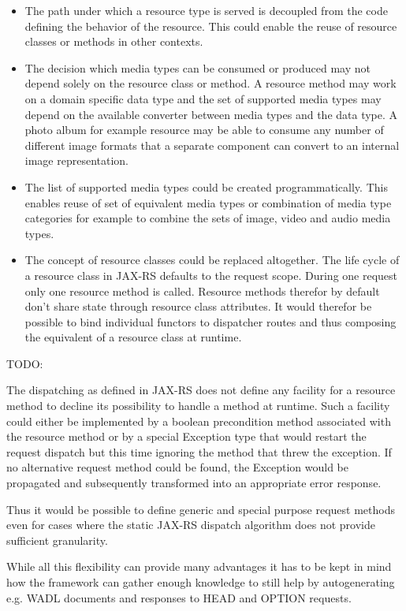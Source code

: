 \documentclass[12pt,a4paper]{scrartcl}		%
\begin{document}
\begin{itemize}
\item The path under which a resource type is served is decoupled from the code
  defining the behavior of the resource. This could enable the reuse of resource
  classes or methods in other contexts.
\item The decision which media types can be consumed or produced may not depend
  solely on the resource class or method. A resource method may work on a domain
  specific data type and the set of supported media types may depend on the
  available converter between media types and the data type. A photo album for example
  resource may be able to consume any number of different image formats that
  a separate component can convert to an internal image representation.
\item The list of supported media types could be created programmatically. This
  enables reuse of set of equivalent media types or combination of media type
  categories for example to combine the sets of image, video and audio media
  types.
\item The concept of resource classes could be replaced altogether. The life
  cycle of a resource class in JAX-RS defaults to the request scope. During one
  request only one resource method is called. Resource methods therefor by
  default don't share state through resource class attributes. It would therefor
  be possible to bind individual functors to dispatcher routes and thus
  composing the equivalent of a resource class at runtime.
\end{itemize}

TODO:

The dispatching as defined in JAX-RS does not define any facility for a resource
method to decline its possibility to handle a method at runtime. Such a facility
could either be implemented by a boolean precondition method associated with the
resource method or by a special Exception type that would restart the request
dispatch but this time ignoring the method that threw the exception. If no
alternative request method could be found, the Exception would be propagated and
subsequently transformed into an appropriate error response.

Thus it would be possible to define generic and special purpose request methods
even for cases where the static JAX-RS dispatch algorithm does not provide
sufficient granularity.

While all this flexibility can provide many advantages it has to be kept in mind
how the framework can gather enough knowledge to still help by autogenerating
e.g. WADL documents and responses to HEAD and OPTION requests.
\end{document}
